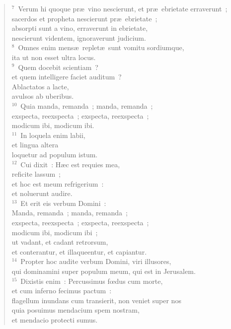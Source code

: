\begin{verse}${}^{7}$~Verum hi quoque pr\ae\ vino nescierunt, et pr\ae\ ebrietate erraverunt~;\\ sacerdos et propheta nescierunt pr\ae\ ebrietate~;\\ absorpti sunt a vino, erraverunt in ebrietate,\\ nescierunt videntem, ignoraverunt judicium.\\
${}^{8}$~Omnes enim mens\ae\ replet\ae\ sunt vomitu sordiumque,\\ ita ut non esset ultra locus.\\
${}^{9}$~Quem docebit scientiam~?\\ et quem intelligere faciet auditum~?\\ Ablactatos a lacte,\\ avulsos ab uberibus.\\
${}^{10}$~Quia manda, remanda~; manda, remanda~;\\ exspecta, reexspecta~; exspecta, reexspecta~;\\ modicum ibi, modicum ibi.\\
${}^{11}$~In loquela enim labii,\\ et lingua altera\\ loquetur ad populum istum.\\
${}^{12}$~Cui dixit~: H\ae c est requies mea,\\ reficite lassum~;\\ et hoc est meum refrigerium~:\\ et noluerunt audire.\\
${}^{13}$~Et erit eis verbum Domini~:\\ Manda, remanda~; manda, remanda~;\\ exspecta, reexspecta~; exspecta, reexspecta~;\\ modicum ibi, modicum ibi~;\\ ut vadant, et cadant retrorsum,\\ et conterantur, et illaqueentur, et capiantur.\\
${}^{14}$~Propter hoc audite verbum Domini, viri illusores,\\ qui dominamini super populum meum, qui est in Jerusalem.\\
${}^{15}$~Dixistis enim~: Percussimus fœdus cum morte,\\ et cum inferno fecimus pactum~:\\ flagellum inundans cum transierit, non veniet super nos\\ quia posuimus mendacium spem nostram,\\ et mendacio protecti sumus.\\

\end{verse}
